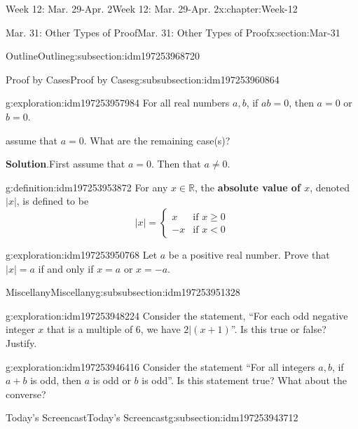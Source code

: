 \documentclass[oneside,10pt,]{book}
\newcommand{\blocktitlefont}{\relax}
\newcommand{\terminology}[1]{\textbf{#1}}
\numberwithin{equation}{section}
\renewcommand{\ge}{\geqslant}
\def\R{{\mathbb R}}
\newcommand{\R}{\mathbb R}
\newcommand{\lt}{<}
\newcommand{\amp}{&}
\begin{document}
\begin{chapterptx}{Week 12: Mar. 29-Apr. 2}{}{Week 12: Mar. 29-Apr. 2}{}{}{x:chapter:Week-12}
\begin{sectionptx}{Mar. 31: Other Types of Proof}{}{Mar. 31: Other Types of Proof}{}{}{x:section:Mar-31}
\begin{subsectionptx}{Outline}{}{Outline}{}{}{g:subsection:idm197253968720}
\begin{subsubsectionptx}{Proof by Cases}{}{Proof by Cases}{}{}{g:subsubsection:idm197253960864}
\begin{exploration}{}{g:exploration:idm197253957984}
For all real numbers \(a,b\), if \(ab=0\), then \(a=0\) or \(b=0\).%
\par\smallskip%
\noindentFirst assume that \(a=0\). What are the remaining case(s)?\par\smallskip%
\noindent\textbf{\blocktitlefont Solution}.\hypertarget{g:solution:idm197253955056}{}\quad{}First assume that \(a=0\). Then that \(a\ne 0\).%
\end{exploration}%
\begin{definition}{}{g:definition:idm197253953872}%
%
For any \(x\in\R\), the \terminology{absolute value of \(x\)}, denoted \(|x|\), is defined to be%
\begin{equation*}
|x| = \begin{cases} x \amp \text{if } x\ge 0\\ -x \amp \text{if } x\lt 0\end{cases}
\end{equation*}
%
\end{definition}
\begin{exploration}{}{g:exploration:idm197253950768}%
Let \(a\) be a positive real number. Prove that \(|x| = a\) if and only if \(x=a\) or \(x=-a\).%
\end{exploration}%
\end{subsubsectionptx}
%
%
\typeout{************************************************}
\typeout{************************************************}
%
\begin{subsubsectionptx}{Miscellany}{}{Miscellany}{}{}{g:subsubsection:idm197253951328}
\begin{exploration}{}{g:exploration:idm197253948224}%
Consider the statement, ``For each odd negative integer \(x\) that is a multiple of 6, we have \(2|(x+1)\)''. Is this true or false? Justify.%
\end{exploration}%
\begin{exploration}{}{g:exploration:idm197253946416}%
Consider the statement ``For all integers \(a,b\), if \(a+b\) is odd, then \(a\) is odd or \(b\) is odd''. Is this statement true? What about the converse?%
\end{exploration}%
\end{subsubsectionptx}
\end{subsectionptx}
%
%
\typeout{************************************************}
\typeout{************************************************}
%
\begin{subsectionptx}{Today's Screencast}{}{Today's Screencast}{}{}{g:subsection:idm197253943712}

\end{subsectionptx}
\end{sectionptx}
\end{chapterptx}
\end{document}
